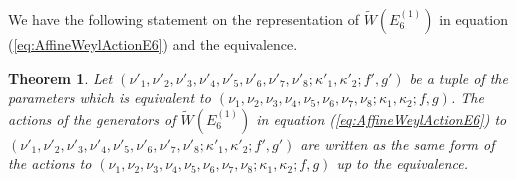 \documentclass[12pt]{amsart}
\numberwithin{equation}{section}
\newtheorem{thm}[prop]{\bf Theorem}
\theoremstyle{definition}
\begin{document}
We have the following statement on the representation of $\widetilde{W}(E^{(1)}_{6})$ in equation (\ref{eq:AffineWeylActionE6}) and the equivalence.
\begin{thm} \label{thm:E6compati}
Let $(\nu '_1 , \nu '_2 , \nu '_3 , \nu '_4 ,\nu '_5 ,\nu '_6 , \nu '_7 ,\nu '_8 ; \kappa '_1 ,\kappa '_2 ; f' ,g' ) $ be a tuple of the parameters which is equivalent to $ (\nu_1 , \nu_2 , \nu_3 , \nu_4 ,\nu_5 ,\nu_6 , \nu_7 ,\nu_8 ;\kappa_1 ,\kappa_2 ; f ,g )$.
The actions of the generators of  $\widetilde{W}(E^{(1)}_6)$ in equation (\ref{eq:AffineWeylActionE6}) to $(\nu '_1 , \nu '_2 , \nu '_3 , \nu '_4 ,\nu '_5 ,\nu '_6 , \nu '_7 ,\nu '_8 ; \kappa '_1 ,\kappa '_2 ; f' ,g' ) $ are written as the same form of the actions to $(\nu _1 , \nu _2 , \nu _3 , \nu _4 ,\nu _5 ,\nu _6 , \nu _7 ,\nu _8 ; \kappa _1 ,\kappa _2 ; f ,g ) $ up to the equivalence.
\end{thm}
\end{document}

